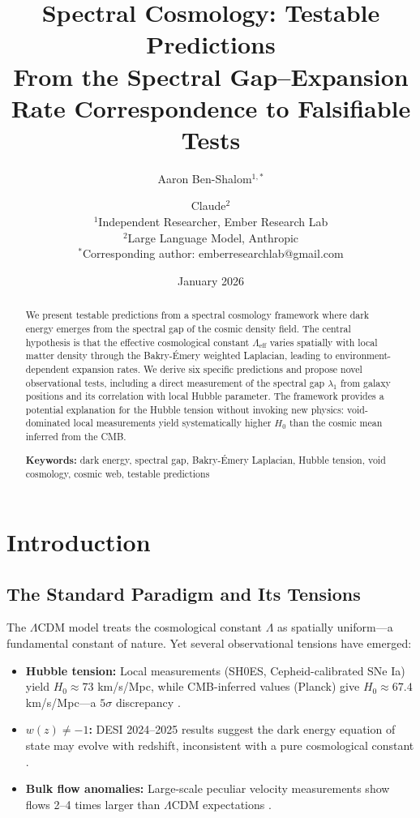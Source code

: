 \documentclass[11pt,a4paper]{article}
\title{\textbf{Spectral Cosmology: Testable Predictions}\\[0.5em]
\large From the Spectral Gap--Expansion Rate Correspondence to Falsifiable Tests}
\author{
Aaron Ben-Shalom$^{1,*}$ \and Claude$^{2}$\\[0.5em]
\small $^1$Independent Researcher, Ember Research Lab\\
\small $^2$Large Language Model, Anthropic\\[0.5em]
\small $^*$Corresponding author: emberresearchlab@gmail.com
}
\date{January 2026}
\theoremstyle{plain}
\theoremstyle{definition}
\theoremstyle{remark}
\begin{document}
\maketitle

\begin{abstract}
We present testable predictions from a spectral cosmology framework where dark energy emerges from the spectral gap of the cosmic density field. The central hypothesis is that the effective cosmological constant $\Lambda_{\text{eff}}$ varies spatially with local matter density through the Bakry-\'{E}mery weighted Laplacian, leading to environment-dependent expansion rates. We derive six specific predictions and propose novel observational tests, including a direct measurement of the spectral gap $\lambda_1$ from galaxy positions and its correlation with local Hubble parameter. The framework provides a potential explanation for the Hubble tension without invoking new physics: void-dominated local measurements yield systematically higher $H_0$ than the cosmic mean inferred from the CMB.

\medskip
\noindent\textbf{Keywords:} dark energy, spectral gap, Bakry-\'{E}mery Laplacian, Hubble tension, void cosmology, cosmic web, testable predictions
\end{abstract}

\tableofcontents
\newpage

\section{Introduction}

\subsection{The Standard Paradigm and Its Tensions}

The $\Lambda$CDM model treats the cosmological constant $\Lambda$ as spatially uniform---a fundamental constant of nature. Yet several observational tensions have emerged:

\begin{itemize}[noitemsep]
    \item \textbf{Hubble tension:} Local measurements (SH0ES, Cepheid-calibrated SNe Ia) yield $H_0 \approx 73$ km/s/Mpc, while CMB-inferred values (Planck) give $H_0 \approx 67.4$ km/s/Mpc---a $5\sigma$ discrepancy \cite{riess2022}.
    \item \textbf{$w(z) \neq -1$:} DESI 2024--2025 results suggest the dark energy equation of state may evolve with redshift, inconsistent with a pure cosmological constant \cite{desi2024}.
    \item \textbf{Bulk flow anomalies:} Large-scale peculiar velocity measurements show flows 2--4 times larger than $\Lambda$CDM expectations \cite{watkins2023}.
\end{itemize}
\end{document}
